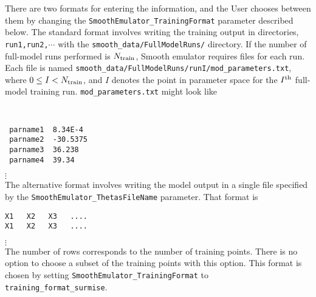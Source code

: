 \documentclass[UserManual.tex]{subfiles}
\begin{document}
\begin{enumerate}
There are two formats for entering the information, and the User chooses between them by changing the {\tt SmoothEmulator\_TrainingFormat} parameter described below. The standard format involves writing the training output in directories, {\tt run1,run2,}$\cdots$ with the {\tt smooth\_data/FullModelRuns/} directory. If the number of full-model runs performed is $N_{\rm train}$, Smooth emulator requires files for each run. Each file is named {\tt smooth\_data/FullModelRuns/runI/mod\_parameters.txt}, where $0\le I<N_{\rm train}$, and $I$ denotes the point in  parameter space for the $I^{\rm th}$ full-model training run. {\tt mod\_parameters.txt} might look like
{\tt
\begin{verbatim}
 parname1  8.34E-4
 parname2  -30.5375
 parname3  36.238
 parname4  39.34
\end{verbatim}}
\vspace*{-16pt}
 \hspace*{28pt}$\vdots$\\

The alternative format involves writing the model output in a single file specified by the {\tt SmoothEmulator\_ThetasFileName} parameter. That format is
\vspace*{-8pt}
{\tt\begin{verbatim}
X1   X2   X3   ....
X1   X2   X3   ....
\end{verbatim}}
\vspace*{-16pt}
 \hspace*{28pt}$\vdots$\\
 
The number of rows corresponds to the number of training points. There is no option to choose a subset of the training points with this option. This format is chosen by setting {\tt SmoothEmulator\_TrainingFormat} to {\tt training\_format\_surmise}.


\end{enumerate}
\end{document}
